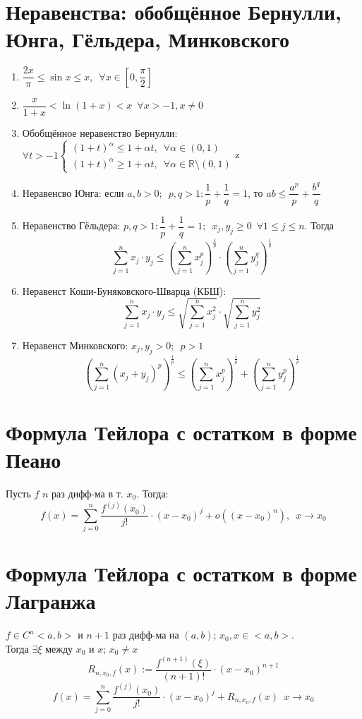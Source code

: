 \documentclass[11pt, a4paper, utf-8]{article}
\def\R{\mathbb{R}}
\def\sp{\, \, \,}
\begin{document}
    \section{Неравенства: обобщённое Бернулли, Юнга, Гёльдера, Минковского}
    \begin{enumerate}
        \item $\dfrac{2x}{\pi} \leq \sin x \leq x,\sp \forall x \in \left[0, \dfrac{\pi}{2}\right]$
        \item $\dfrac{x}{1+x} < \ln (1+x) < x \sp \forall x > -1, x \neq 0$
        \item Обобщённое неравенство Бернулли: $\forall t > -1
        \begin{cases}
            (1+t)^{\alpha} \leq 1 + \alpha t, \sp \forall \alpha \in (0,1)\\
            (1+t)^{\alpha} \geq 1 + \alpha t, \sp \forall \alpha \in \R \setminus (0,1)
        \end{cases}$z
        \item Неравенсво Юнга: если $a, b > 0; \sp p, q > 1 : \dfrac{1}{p} + \dfrac{1}{q} = 1$, то $ab \leq \dfrac{a^p}{p} + \dfrac{b^q}{q}$
        \item Неравенство Гёльдера: $p,q > 1: \dfrac{1}{p} + \dfrac{1}{q} = 1; \sp x_j, y_j \geq 0 \sp \forall 1 \leq j \leq n$. Тогда
        $$\sum_{j=1}^nx_j \cdot y_j \leq \left(\sum_{j=1}^n x_j^p\right)^{\frac{1}{p}} \cdot \left(\sum_{j=1}^n y_j^q\right)^{\frac{1}{q}}$$

        \item Неравенст Коши-Буняковского-Шварца (КБШ):
        $$\sum_{j=1}^nx_j \cdot y_j \leq \sqrt{\sum_{j=1}^n x_j^2} \cdot \sqrt{\sum_{j=1}^n y_j^2}$$

        \item Неравенст Минковского: $x_j, y_j > 0; \sp p > 1$
        $$\left(\sum_{j=1}^n (x_j + y_j)^p\right)^{\frac{1}{p}} \leq \left(\sum_{j=1}^n x_j^p\right)^{\frac{1}{p}} + \left(\sum_{j=1}^n y_j^p\right)^{\frac{1}{p}}$$
    \end{enumerate}

    \section{Формула Тейлора с остатком в форме Пеано}
    Пусть $f$ $n$ раз дифф-ма в т. $x_0$. Тогда:
    $$f(x) = \sum_{j = 0}^n \frac{f^{(j)}(x_0)}{j!} \cdot (x-x_0)^j + o((x-x_0)^n), \sp x \to x_0$$

    \section{Формула Тейлора с остатком в форме Лагранжа}
    $f \in C^n<a, b>$ и $n+1$ раз дифф-ма на $(a, b)$; $x_0, x \in <a,b>$.\\
    Тогда $\exists \xi$ между $x_0$ и $x$; $x_0 \neq x$\\
    $$R_{n, x_0, f}(x) := \frac{f^{(n+1)}(\xi)}{(n+1)!} \cdot (x-x_0)^{n+1}$$
    $$f(x) = \sum_{j = 0}^n \frac{f^{(j)}(x_0)}{j!} \cdot (x-x_0)^j + R_{n, x_0, f}(x) \sp x \to x_0$$
\end{document}
